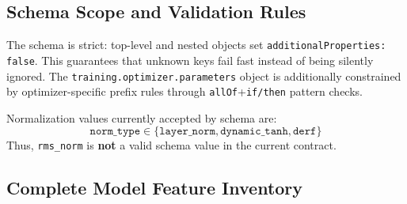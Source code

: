 \documentclass[11pt,a4paper]{article}
\begin{document}
\subsection{Schema Scope and Validation Rules}
\label{sec:schema-validation}

The schema is strict: top-level and nested objects set \texttt{additionalProperties: false}. This guarantees that unknown keys fail fast instead of being silently ignored. The \texttt{training.optimizer.parameters} object is additionally constrained by optimizer-specific prefix rules through \texttt{allOf}+\texttt{if/then} pattern checks.

Normalization values currently accepted by schema are:
\[
\texttt{norm\_type} \in \{\texttt{layer\_norm}, \texttt{dynamic\_tanh}, \texttt{derf}\}
\]
Thus, \texttt{rms\_norm} is \textbf{not} a valid schema value in the current contract.

\subsection{Complete Model Feature Inventory}
\end{document}
